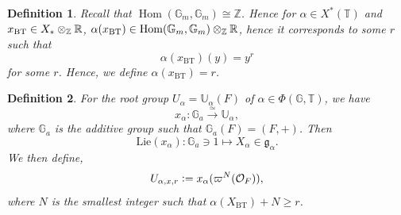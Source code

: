 \documentclass[10pt]{article}
\newtheorem{definition}{Definition}[section]
\numberwithin{equation}{theorem}
\DeclareMathOperator{\Hom}{Hom}
\newcommand{\defeq}{\vcentcolon=}
\newcommand{\bR}[0]{\mathbb{R}}
\newcommand{\Ouv}[0]{\mathcal{O}}
\newcommand{\Z}[0]{\mathbb{Z}}
\newcommand{\G}[0]{\mathbb{G}}
\newcommand{\Lie}[0]{\mathrm{Lie}}
\newcommand{\bT}[0]{\mathbb{T}}
\newcommand{\g}[0]{\mathfrak{g}}
\newcommand{\tens}[1]{%
  \mathbin{\mathop{\otimes}\displaylimits_{#1}}%
}
\begin{document}
\begin{definition}
    Recall that $\Hom(\G_m,\G_m)\cong \Z$. Hence for $\alpha\in X^*(\bT)$ and $x_{\mathrm{BT}}\in X_*\tens{\Z}\bR$, $\alpha(x_{\mathrm{BT}})\in \Hom(\G_m,\G_m)\tens{\Z}\bR$, hence it corresponds to some $r$ such that 
    \begin{equation*}
        \alpha(x_{\mathrm{BT}})(y) = y^r
    \end{equation*}
    for some $r$. Hence, we define $\alpha(x_{\mathrm{BT}})=r$.
\end{definition}

\begin{definition}
    For the root group $U_\alpha=\mathbb{U}_\alpha(F)$ of $\alpha\in\Phi(\G,\bT)$, we have 
    \begin{equation*}
        x_\alpha:\G_a\stackrel{\simeq}{\to}\mathbb{U}_\alpha,
    \end{equation*}
    where $\G_a$ is the additive group such that $\G_a(F) = (F,+)$. Then 
    \begin{equation*}
        \Lie(x_\alpha):\G_a\ni 1\mapsto X_\alpha\in \g_\alpha.
    \end{equation*}
    We then define,
    \begin{equation*}
        U_{\alpha,x,r}\defeq x_\alpha(\varpi^N(\Ouv_F)),
    \end{equation*}
    where $N$ is the smallest integer such that $\alpha(X_{\mathrm{BT}})+N\geq r$.
\end{definition}
\end{document}
